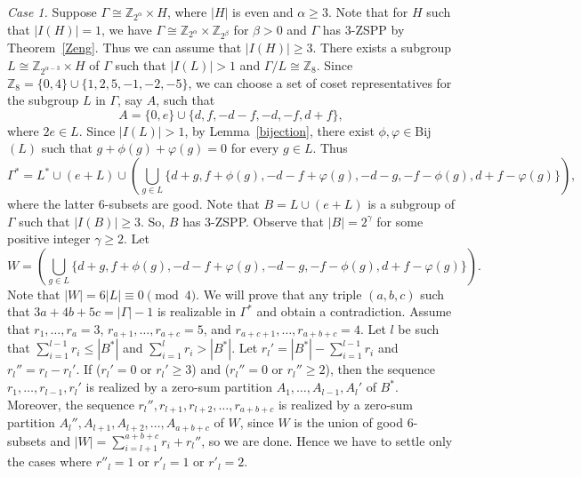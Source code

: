 \documentclass[final]{dmtcs-episciences}
\newcommand{\zet}{\mathbb{Z}}
\begin{document}
\textit{Case 1.} Suppose $\Gamma \cong \zet_{2^{\alpha}}\times H$, where $|H|$ is even and $\alpha\geq 3$. Note that for $H$ such that $|I(H)|=1$, we have $\Gamma \cong \zet_{2^{\alpha}}\times \zet_{2^{\beta}}$ for $\beta>0$ and $\Gamma$ has $3$-ZSPP by Theorem~\ref{Zeng}. Thus we can assume that $|I(H)|\geq3$. There exists a subgroup $L \cong   \zet_{2^{\alpha-3}}\times H$ of $\Gamma$ such that $|I(L)|>1$ and
$\Gamma/L \cong \zet_8$. Since $\zet_8=\{0,4\}\cup\{1,2,5,-1,-2,-5\}$, we can choose a set of coset representatives for the subgroup $L$ in $\Gamma$, say  $A$, such
that $$A = \{0, e\} \cup \{d, f,-d - f,-d,-f, d + f\},$$
where $2e \in L$. Since  $|I(L)|>1$, by Lemma~\ref{bijection}, there exist $\phi,\varphi\in$Bij$(L)$ such that $g+\phi(g)+\varphi(g)=0$ for every $g\in L$. Thus
$$\Gamma^{*} = L^{*} \cup(e+L) \cup \left(\bigcup \limits_{g\in L}\{d+g, f+\phi(g),-d-f+\varphi(g),-d-g,-f-\phi(g), d+f-\varphi(g)\}\right),$$
where the latter 6-subsets are good. Note that $B=L\cup(e+L)$ is a subgroup of $\Gamma$ such that $|I(B)|\geq 3$. So, $B$ has $3$-ZSPP.
Observe that $|B|=2^{\gamma}$ for some positive integer $\gamma\geq 2$. Let
 $$W=\left(\bigcup\limits_{g\in L}\{d+g, f+\phi(g),-d-f+\varphi(g),-d-g,-f-\phi(g), d+f-\varphi(g)\}\right).$$ Note that $|W|=6|L|\equiv0\pmod 4$. We will prove that any triple $(a,b,c)$ such that $3a+4b+5c=|\Gamma|-1$ is realizable in $\Gamma^*$ and obtain a contradiction. 
 Assume that $r_1,\dots,r_{a}=3$, $r_{a+1},\ldots,r_{a+c}=5$, and $r_{a+c+1},\dots,r_{a+b+c}=4$. Let $l$ be such that $\sum_{i=1}^{l-1} r_i\leq|B^*|$ and $\sum_{i=1}^{l} r_i> |B^*|$.
Let $r_{l}'=|B^{*}|- \sum_{i=1}^{l-1} r_i$ and $r_l''=r_l-r_l'$. 
If ($r_l'=0$ or $r_l'\geq 3$) and ($r_l''=0$ or  $r_l''\geq 2$), then the sequence $r_1,\ldots,r_{l-1},r_{l}'$ is realized by a zero-sum partition $A_1,\ldots,A_{l-1},A_{l}'$ of $B^*$. Moreover, the sequence $r_{l}'', r_{l+1}, r_{l+2}, \ldots, r_{a+b+c}$ is realized by a zero-sum partition $A_{l}'',A_{l+1},A_{l+2},\ldots,A_{a+b+c}$ of $W$, since $W$ is the union of good $6$-subsets and $|W|=\sum_{i=l+1}^{a+b+c}r_i+r_{l}''$, so we are done. Hence we have to settle only the cases where $r''_l=1$ or $r'_l=1$ or $r'_l=2$.
\end{document}
